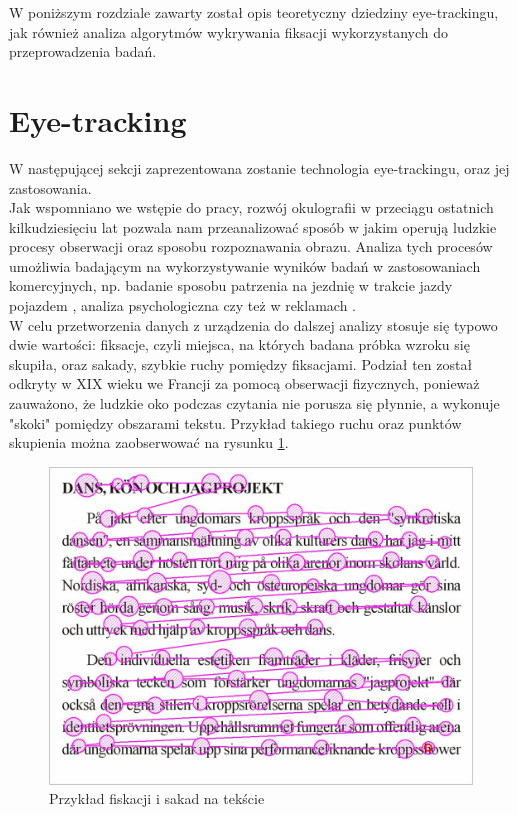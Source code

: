 W poniższym rozdziale zawarty został opis teoretyczny dziedziny eye-trackingu, jak również analiza algorytmów wykrywania fiksacji wykorzystanych do przeprowadzenia badań.
\section{Eye-tracking}
W następującej sekcji zaprezentowana zostanie technologia eye-trackingu, oraz jej zastosowania.\\[\baselineskip]
Jak wspomniano we wstępie do pracy, rozwój okulografii w przeciągu ostatnich kilkudziesięciu lat pozwala nam przeanalizować sposób w jakim operują ludzkie procesy obserwacji oraz sposobu rozpoznawania obrazu. Analiza tych procesów umożliwia badającym na wykorzystywanie wyników badań w zastosowaniach komercyjnych, np. badanie sposobu patrzenia na jezdnię w trakcie jazdy pojazdem \cite{CarSteering}, analiza psychologiczna \cite{GazeEyeTrackingSolutions} czy też w reklamach \cite{Advertising}.\\[\baselineskip]
W celu przetworzenia danych z urządzenia do dalszej analizy stosuje się typowo dwie wartości: fiksacje, czyli miejsca, na których badana próbka wzroku się skupiła, oraz sakady, szybkie ruchy pomiędzy fiksacjami. Podział ten został odkryty w XIX wieku we Francji za pomocą obserwacji fizycznych, ponieważ zauważono, że ludzkie oko podczas czytania nie porusza się płynnie, a wykonuje "skoki" pomiędzy obszarami tekstu. Przykład takiego ruchu oraz punktów skupienia można zaobserwować na rysunku \ref{fig:fiksacje}.
\begin{figure}[H]
    \includegraphics[width=\linewidth]{resources/fixation_example.jpg}
    \caption{Przykład fiskacji i sakad na tekście}
    \label{fig:fiksacje}
\end{figure}
